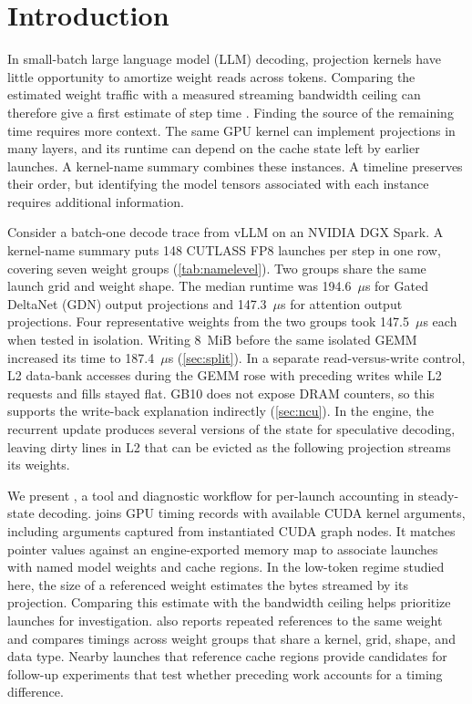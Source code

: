 \section{Introduction}\label{sec:intro}

In small-batch large language model (LLM) decoding, projection kernels have
little opportunity to amortize weight reads across tokens. Comparing the
estimated weight traffic with a measured streaming bandwidth ceiling can
therefore give a first estimate of step time
\cite{williams2009roofline,deakin2016babelstream}. Finding the source of the
remaining time requires more context. The same GPU kernel can implement
projections in many layers, and its runtime can depend on the cache state
left by earlier launches. A kernel-name summary combines these instances.
A timeline preserves their order, but identifying the model tensors associated
with each instance requires additional information.

Consider a batch-one decode trace from vLLM on an NVIDIA DGX Spark. A
kernel-name summary puts 148 CUTLASS FP8 launches per step in one row,
covering seven weight groups (\cref{tab:namelevel}). Two groups share the same launch grid and weight
shape. The median runtime was 194.6~\(\mu\)s for Gated DeltaNet (GDN)
output projections and 147.3~\(\mu\)s for attention output projections.
Four representative weights from the two groups took
147.5~\(\mu\)s each when tested in isolation. Writing 8~MiB before the
same isolated GEMM increased its time to 187.4~\(\mu\)s
(\cref{sec:split}). In a separate read-versus-write control, L2 data-bank
accesses during the GEMM rose with preceding writes while L2 requests and
fills stayed flat. GB10 does not expose DRAM counters, so this supports
the write-back explanation indirectly (\cref{sec:ncu}). In the engine,
the recurrent update produces several versions of the state for speculative
decoding, leaving dirty lines in L2 that can be evicted as the following
projection streams its weights.

We present \sys{}, a tool and diagnostic workflow for per-launch accounting
in steady-state decoding. \sys{} joins GPU timing records with available
CUDA kernel arguments, including arguments captured from instantiated CUDA
graph nodes. It matches pointer values against an engine-exported memory map
to associate launches with named model weights and cache regions. In the
low-token regime studied here, the size of a referenced weight estimates
the bytes streamed by its projection. Comparing this estimate with the
bandwidth ceiling helps prioritize launches for investigation.
\sys{} also reports repeated references to the same weight and compares
timings across weight groups that share a kernel, grid, shape, and data
type. Nearby launches that reference cache regions provide candidates for
follow-up experiments that test whether preceding work accounts for a
timing difference.

